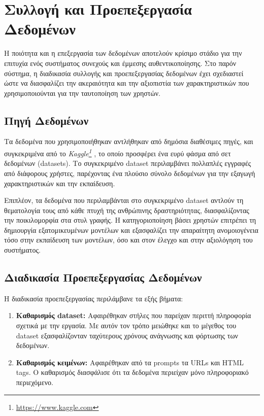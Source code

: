 \section{Συλλογή και Προεπεξεργασία Δεδομένων}
\label{sec:implementations_data}

Η ποιότητα και η επεξεργασία των δεδομένων αποτελούν κρίσιμο στάδιο για την επιτυχία ενός συστήματος συνεχούς και έμμεσης αυθεντικοποίησης. Στο παρόν σύστημα, η διαδικασία συλλογής και προεπεξεργασίας δεδομένων έχει σχεδιαστεί ώστε να διασφαλίζει την ακεραιότητα και την αξιοπιστία των χαρακτηριστικών που χρησιμοποιούνται για την ταυτοποίηση των χρηστών.

\subsection{Πηγή Δεδομένων}

Τα δεδομένα που χρησιμοποιήθηκαν αντλήθηκαν από δημόσια διαθέσιμες πηγές, και συγκεκριμένα από το \textit{Kaggle\footnote{\url{https://www.kaggle.com}}
}, το οποίο προσφέρει ένα ευρύ φάσμα από σετ δεδομένων (datasets). Το συγκεκριμένο dataset περιλαμβάνει πολλαπλές εγγραφές από διάφορους χρήστες, παρέχοντας ένα πλούσιο σύνολο δεδομένων για την εξαγωγή χαρακτηριστικών και την εκπαίδευση. 

Επιπλέον, τα δεδομένα που περιλαμβάνται στο συγκεκριμένο dataset αντλούν τη θεματολογία τους από κάθε πτυχή της ανθρώπινης δραστηριότητας, διασφαλίζοντας την ποικιλομορφία στα στυλ γραφής. Η κατηγοριοποίηση βάσει χρηστών επιτρέπει τη δημιουργία εξατομικευμένων μοντέλων και εξασφαλίζει την απαραίτητη ανομοιογένεια τόσο στην εκπαίδευση των μοντέλων, όσο και στον έλεγχο και στην αξιολόγηση του συστήματος.

\subsection{Διαδικασία Προεπεξεργασίας Δεδομένων}

Η διαδικασία προεπεξεργασίας περιλάμβανε τα εξής βήματα:

\begin{enumerate}
    \item \textbf{Καθαρισμός dataset:} Αφαιρέθηκαν στήλες που παρείχαν περιττή πληροφορία σχετικά με την εργασία. Με αυτόν τον τρόπο μειώθηκε και το μέγεθος του dataset εξασφαλίζονταν ταχύτερους χρόνους ανάγνωσης και φόρτωσης των δεδομένων.
    \item \textbf{Καθαρισμός κειμένων:} Αφαιρέθηκαν από τα prompts τα URLs και HTML tags. Ο καθαρισμός διασφάλισε ότι τα δεδομένα περιείχαν μόνο πληροφοριακό περιεχόμενο.
\end{enumerate}


